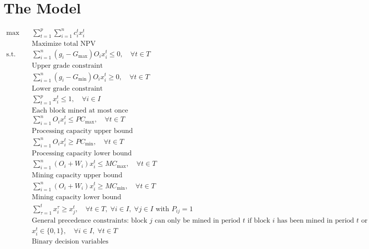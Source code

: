\documentclass{article}
\begin{document}
\section{The Model}
\begin{align*}
    \max \quad & \sum_{t=1}^{p} \sum_{i=1}^{n} c_i^t x_i^t \\
    & \text{Maximize total NPV} \\[6pt]
    \text{s.t.} \quad 
    & \sum_{i=1}^{n} (g_i - G_{\max}) O_i x_i^t \leq 0, \quad \forall t \in T \\
    & \text{Upper grade constraint} \\[6pt]
    & \sum_{i=1}^{n} (g_i - G_{\min}) O_i x_i^t \geq 0, \quad \forall t \in T \\
    & \text{Lower grade constraint} \\[6pt]
    & \sum_{t=1}^{p} x_i^t \leq 1, \quad \forall i \in I \\
    & \text{Each block mined at most once} \\[6pt]
    & \sum_{i=1}^{n} O_i x_i^t \leq PC_{\max}, \quad \forall t \in T \\
    & \text{Processing capacity upper bound} \\[6pt]
    & \sum_{i=1}^{n} O_i x_i^t \geq PC_{\min}, \quad \forall t \in T \\
    & \text{Processing capacity lower bound} \\[6pt]
    & \sum_{i=1}^{n} (O_i + W_i) x_i^t \leq MC_{\max}, \quad \forall t \in T \\
    & \text{Mining capacity upper bound} \\[6pt]
    & \sum_{i=1}^{n} (O_i + W_i) x_i^t \geq MC_{\min}, \quad \forall t \in T \\
    & \text{Mining capacity lower bound} \\[6pt]
    & \sum_{\tau=1}^{t} x_i^{\tau} \geq x_j^t, \quad \forall t \in T,\; \forall i \in I,\; \forall j \in I \text{ with } P_{ij} = 1 \\
    & \text{General precedence constraints: block $j$ can only be mined in period $t$ if block $i$ has been mined in period $t$ or earlier} \\[6pt]
    & x_i^t \in \{0,1\}, \quad \forall i \in I,\; \forall t \in T \\
    & \text{Binary decision variables}
\end{align*}
\end{document}
